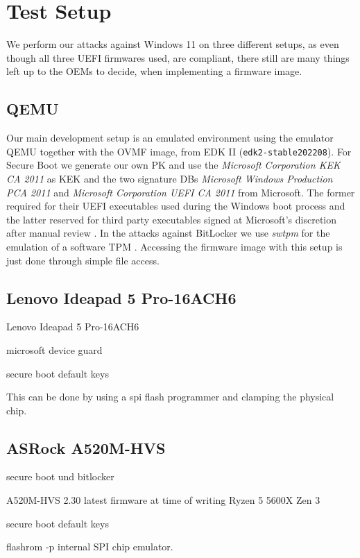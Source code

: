 
\chapter{Test Setup}
\label{sec:test-setup}

We perform our attacks against Windows 11 on three different setups, as even though all three \ac{UEFI} firmwares used, are \cite{pi-spec} compliant, there still are many things left up to the \acp{OEM} to decide, when implementing a firmware image.

\section{\acs{QEMU}}
\label{sec:test-setup:qemu}

Our main development setup is an emulated environment using the emulator \ac{QEMU} \cite{qemu} together with the \ac{OVMF} image, from \ac{EDK} II (\lstinline{edk2-stable202208}).
For Secure Boot we generate our own \ac{PK} and use the \emph{Microsoft Corporation \acs{KEK} \acs{CA} 2011} as \ac{KEK} and the two signature \acp{DB} \emph{Microsoft Windows Production PCA 2011} and \emph{Microsoft Corporation UEFI CA 2011} from Microsoft. The former required for their \ac{UEFI} executables used during the Windows boot process \cite{microsoft-secure-boot-guidance} and the latter reserved for third party executables signed at Microsoft's discretion after manual review  \cite{microsoft-uefi-signing}.
In the attacks against BitLocker we use \emph{swtpm} for the emulation of a software \ac{TPM} \cite{swtpm}. Accessing the firmware image with this setup is just done through simple file access.

\section{Lenovo Ideapad 5 Pro-16ACH6}
\label{sec:test-setup:lenovo}

Lenovo Ideapad 5 Pro-16ACH6


microsoft device guard

secure boot default keys


This can be done by using a spi flash programmer and clamping the physical chip. 

\section{ASRock A520M-HVS}
\label{sec:test-setup:asrock}



secure boot und bitlocker


A520M-HVS 2.30 latest firmware at time of writing
Ryzen 5 5600X Zen 3

secure boot default keys


flashrom -p internal
SPI chip emulator. 
